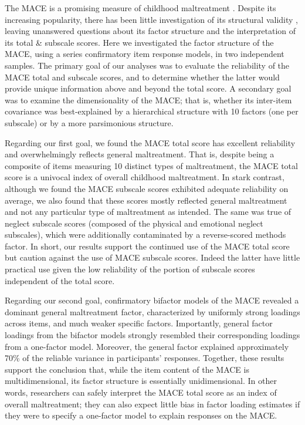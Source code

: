 \documentclass[letterpaper,man,natbib,noextraspace,floatsintext,longtable,12pt]{apa6}
\begin{document}
The MACE is a promising measure of childhood maltreatment \citep{georgieva2022systematic}. Despite its increasing popularity, there has been little investigation of its structural validity \citep{saini2019systematic}, leaving unanswered questions about its factor structure and the interpretation of its total \& subscale scores. Here we investigated the factor structure of the MACE, using a series confirmatory item response models, in two independent samples. The primary goal of our analyses was to evaluate the reliability of the MACE total and subscale scores, and to determine whether the latter would provide unique information above and beyond the total score. A secondary goal was to examine the dimensionality of the MACE; that is, whether its inter-item covariance was best-explained by a hierarchical structure with 10 factors (one per subscale) or by a more parsimonious structure. 

Regarding our first goal, we found the MACE total score has excellent reliability and overwhelmingly reflects general maltreatment. That is, despite being a composite of items measuring 10 distinct types of maltreatment, the MACE total score is a univocal index of overall childhood maltreatment. In stark contrast, although we found the MACE subscale scores exhibited adequate reliability on average, we also found that these scores mostly reflected general maltreatment and not any particular type of maltreatment as intended. The same was true of neglect subscale scores (composed of the physical and emotional neglect subscales), which were additionally contaminated by a reverse-scored methods factor. In short, our results support the continued use of the MACE total score but caution against the use of MACE subscale scores. Indeed the latter have little practical use given the low reliability of the portion of subscale scores independent of the total score.

Regarding our second goal, confirmatory bifactor models of the MACE revealed a dominant general maltreatment factor, characterized by uniformly strong loadings across items, and much weaker specific factors. Importantly, general factor loadings from the bifactor models strongly resembled their corresponding loadings from a one-factor model. Moreover, the general factor explained approximately 70\% of the reliable variance in participants' responses. Together, these results support the conclusion that, while the item content of the MACE is multidimensional, its factor structure is essentially unidimensional. In other words, researchers can safely interpret the MACE total score as an index of overall maltreatment; they can also expect little bias in factor loading estimates if they were to specify a one-factor model to explain responses on the MACE. 
\end{document}
